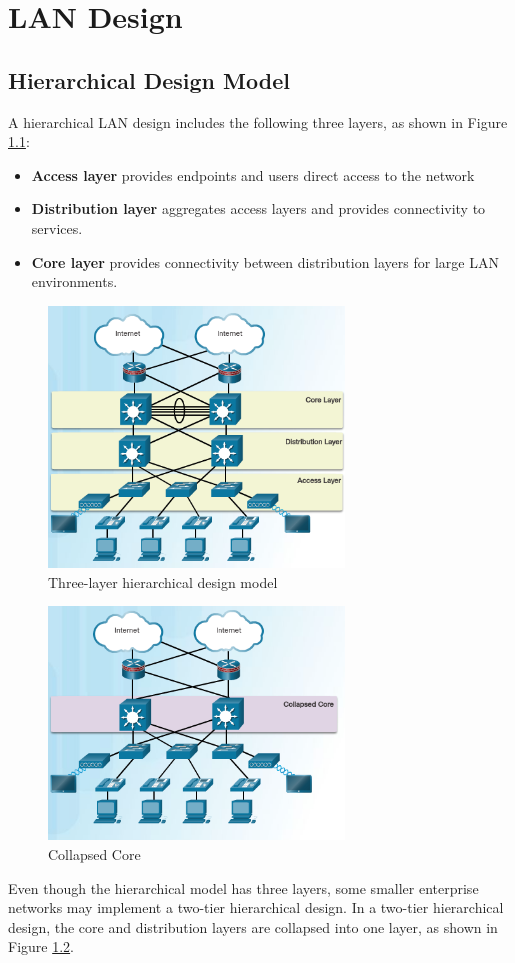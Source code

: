 \chapter{LAN Design}
\section{Hierarchical Design Model}
A hierarchical LAN design includes the following three layers, as shown in Figure \ref{Hierarchical-model}:
\begin{itemize}
\item \textbf{Access layer}  provides endpoints and users direct access to the network
\item \textbf{Distribution layer} aggregates access layers and provides connectivity to services. 
\item \textbf{Core layer} provides connectivity between distribution layers for large LAN environments.
\end{itemize}
\begin{figure}[hbtp]
\centering
\includegraphics[width=0.7\textwidth]{pictures/Hierarchical-model.png}
\caption{Three-layer hierarchical design model}
\label{Hierarchical-model}
\end{figure}
\begin{figure}[hbtp]
\centering
\includegraphics[width=0.7\textwidth]{pictures/collapsed-core.png}
\caption{Collapsed Core}
\label{collapsed-core}
\end{figure}
Even though the hierarchical model has three layers, some smaller enterprise networks may implement a two-tier hierarchical design. In a two-tier hierarchical design, the core and distribution layers are collapsed into one layer, as shown in Figure \ref{collapsed-core}.
